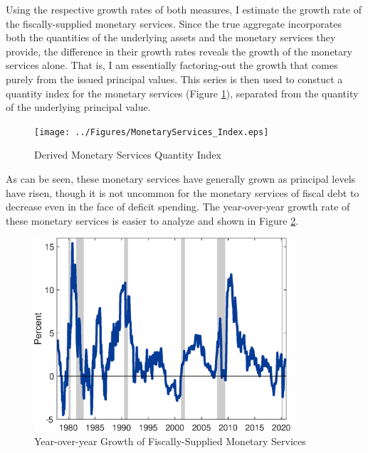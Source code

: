 \documentclass[11pt,a4paper,margin=1.5in]{article}
\begin{document}
Using the respective growth rates of both measures, I estimate the growth rate of the fiscally-supplied monetary services.
Since the true aggregate incorporates both the quantities of the underlying assets and the monetary services they provide, the difference in their growth rates reveals the growth of the monetary services alone.
That is, I am essentially factoring-out the growth that comes purely from the issued principal values.
This series is then used to constuct a quantity index for the monetary services (Figure \ref{fig:MS_Index}), separated from the quantity of the underlying principal value.
\begin{figure}[p!]
	\centering
	\texttt{[image: ../Figures/MonetaryServices\_Index.eps]}
	\caption{Derived Monetary Services Quantity Index}
	\label{fig:MS_Index}
\end{figure}
As can be seen, these monetary services have generally grown as principal levels have risen, though it is not uncommon for the monetary services of fiscal debt to decrease even in the face of deficit spending.
The year-over-year growth rate of these monetary services is easier to analyze and shown in Figure \ref{fig:YoY_Growth}.
\begin{figure}[p!]
	\centering
	\includegraphics[width=0.85\textwidth]{../Figures/YoYGrowth_MonServices.eps}
	\caption{Year-over-year Growth of Fiscally-Supplied Monetary Services}
	\label{fig:YoY_Growth}
\end{figure}
\end{document}
